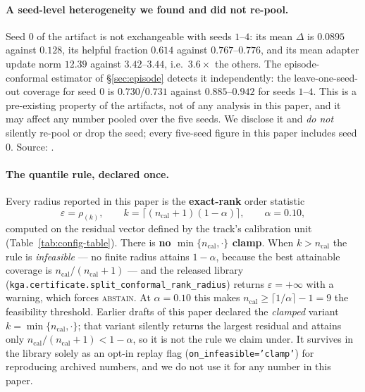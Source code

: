 \paragraph{A seed-level heterogeneity we found and did not re-pool.} Seed $0$ of the
 artifact is not exchangeable with seeds $1$--$4$: its mean $\Delta$
is $0.0895$ against $0.128$, its helpful fraction $0.614$ against $0.767$--$0.776$, and its mean
adapter update norm $12.39$ against $3.42$--$3.44$, i.e.\ $3.6\times$ the others. The
episode-conformal estimator of \S\ref{sec:episode} detects it independently: the leave-one-seed-out
coverage for seed $0$ is $0.730$/$0.731$ against $0.885$--$0.942$ for seeds $1$--$4$. This is a
pre-existing property of the artifacts, not of any analysis in this paper, and it may affect any
number pooled over the five seeds. We disclose it and \emph{do not} silently re-pool or drop the
seed; every five-seed figure in this paper includes seed $0$. Source:
.

\paragraph{The quantile rule, declared once.}\label{par:quantile-rule}
Every radius reported in this paper is the \textbf{exact-rank} order statistic
\[
\varepsilon=\rho_{(k)},\qquad k=\big\lceil (n_{\mathrm{cal}}{+}1)(1-\alpha)\big\rceil,\qquad
\alpha=0.10,
\]
computed on the residual vector defined by the track's calibration unit
(Table~\ref{tab:config-table}). There is \textbf{no $\min\{n_{\mathrm{cal}},\cdot\}$ clamp}. When
$k>n_{\mathrm{cal}}$ the rule is \emph{infeasible} --- no finite radius attains $1-\alpha$, because
the best attainable coverage is $n_{\mathrm{cal}}/(n_{\mathrm{cal}}{+}1)$ --- and the released
library (\texttt{kga.certificate.split\_conformal\_rank\_radius}) returns
$\varepsilon=+\infty$ with a warning, which forces \textsc{abstain}. At $\alpha=0.10$ this makes
$n_{\mathrm{cal}}\ge\lceil1/\alpha\rceil-1=9$ the feasibility threshold. Earlier drafts of this
paper declared the \emph{clamped} variant $k=\min\{n_{\mathrm{cal}},\cdot\}$; that variant silently
returns the largest residual and attains only $n_{\mathrm{cal}}/(n_{\mathrm{cal}}{+}1)<1-\alpha$, so
it is not the rule we claim under. It survives in the library solely as an opt-in replay flag
(\texttt{on\_infeasible='clamp'}) for reproducing archived numbers, and we do not use it for any
number in this paper.


